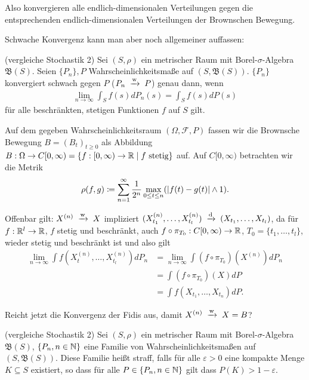 \documentclass[a4paper,twoside,DIV15,BCOR12mm]{scrbook}
\newcommand{\cF}{\mathcal F}
\newcommand{\borel}{{\mathfrak B}}
\begin{document}
Also konvergieren alle endlich-dimensionalen Verteilungen gegen die entsprechenden endlich-dimensionalen Verteilungen der Brownschen Bewegung.

Schwache Konvergenz kann man aber noch allgemeiner auffassen:

\begin{definition}
(vergleiche Stochastik 2) Sei $(S,\rho)$ ein metrischer Raum mit Borel-$\sigma$-Algebra $\borel(S)$. Seien $\{P_n\}, P$ Wahrscheinlichkeitsmaße auf $(S,\borel(S))$. $\{P_n\}$ konvergiert schwach gegen $P$  ($P_n\tonach w P$) genau dann, wenn
\begin{align*}
\lim_{n\to\infty} \int_S f(s) dP_n(s) = \int_S f(s) dP(s)
\end{align*}
für alle beschränkten, stetigen Funktionen $f$ auf $S$ gilt.
\end{definition}

Auf dem gegeben Wahrscheinlichkeitsraum $(\Omega,\cF, P)$ fassen wir die Brownsche Bewegung $B=(B_t)_{t\ge 0}$ als Abbildung $B:\Omega \to C[0,\infty) = \{f: [0,\infty) \to \mathbb{R} \mid f \text{ stetig}\}$ auf. Auf $C[0,\infty)$ betrachten wir die Metrik
\begin{align*}
\rho(f,g) \da \sum_{n=1}^\infty \frac{1}{2^n} \max_{0\le t\le n}( | f(t)-g(t)| \wedge 1).
\end{align*}

Offenbar gilt: $X^{(n)} \tonach w X$ impliziert $(X_{t_1}^{(n)},\ldots,X_{t_l}^{(n)})\tonach d (X_{t_1},\ldots,X_{t_l})$, da für $f:\mathbb{R}^l\to \mathbb{R}$, $f$ stetig und beschränkt, auch $f\circ \pi_{T_0}: C[0,\infty) \to \mathbb{R}$, $T_0=\{t_1,\ldots,t_l\}$, wieder stetig und beschränkt ist und also gilt
\begin{align*}
\lim_{n\to\infty} \int f(X_t^{(n)},\ldots,X_{t_l}^{(n)}) dP_n 
&=\lim_{n\to\infty} \int (f\circ \pi_{T_0}) (X^{(n)}) dP_n\\
&= \int(f\circ \pi_{T_0})(X)dP \\
&= \int f(X_{t_1},\ldots,X_{t_n})dP.
\end{align*}

Reicht jetzt die Konvergenz der Fidis aus, damit $X^{(n)} \tonach w X=B$?

\begin{definition}
(vergleiche Stochastik 2) Sei $(S,\rho)$ ein metrischer Raum mit Borel-$\sigma$-Algebra $\borel(S)$, $\{P_n, n\in\mathbb{N}\}$ eine Familie von Wahrscheinlichkeitsmaßen auf $(S,\borel(S))$. Diese Familie heißt straff, falls für alle $\varepsilon >0$ eine kompakte Menge $K\subseteq S$ existiert, so dass für alle $P\in \{P_n,n\in\mathbb{N}\}$ gilt dass $P(K) > 1-\varepsilon$.
\end{definition}
\end{document}
